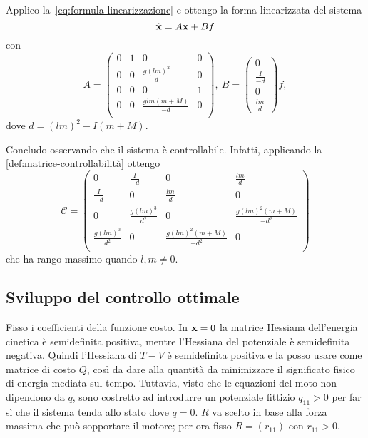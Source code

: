 Applico la~\eqref{eq:formula-linearizzazione} e ottengo la forma linearizzata
del sistema
\begin{equation*}
        \dot {\mathbf{x}} = A\mathbf{x} + Bf \\
\end{equation*}
con
\begin{equation*}
    A = \left(
            \begin{array}{cccc}
                0&1&0&0\\
                0&0&\frac{g(lm)^2}{d}&0\\
                0&0&0&1\\
                0&0&\frac{glm(m+M)}{-d}&0\\
            \end{array}
        \right),\
    B = \left(\begin{array}{c}0\\\frac{I}{-d}\\0\\\frac{lm}{d}\end{array}\right)f,
\end{equation*}
dove $d = (lm)^2-I(m+M)$.

Concludo osservando che il sistema è controllabile.
Infatti, applicando la \autoref{def:matrice-controllabilità}
ottengo
\begin{equation*}
    \mathcal C = \left(
        \begin{array}{cccc}
            0&\frac I {-d}&0&\frac{lm} d\\
            \frac I {-d}&0&\frac{lm} d&0\\
            0&\frac{g(lm)^3}{d^2}&0&\frac{g(lm)^2(m+M)}{-d^2}\\
            \frac{g(lm)^3}{d^2}&0&\frac{g(lm)^2(m+M)}{-d^2}&0\\
        \end{array}
        \right)
\end{equation*}
che ha rango massimo quando $l, m \neq 0$.

\subsection{Sviluppo del controllo ottimale}
Fisso i coefficienti della funzione costo.
In $\mathbf{x} = 0$ la matrice Hessiana dell'energia cinetica è
semidefinita positiva, mentre l'Hessiana del potenziale è
semidefinita negativa.
Quindi l'Hessiana di $T - V$ è semidefinita positiva e
la posso usare come matrice di costo $Q$,
così da dare alla quantità
da minimizzare il significato fisico di energia mediata sul tempo.
Tuttavia, visto che le equazioni del moto non dipendono da $q$,
sono costretto ad introdurre un potenziale fittizio
$q_{11} > 0$ per far sì che il sistema tenda allo
stato dove $q = 0$.
$R$ va scelto in base alla forza massima che può sopportare
il motore; per ora fisso $R = (r_{11})$ con $r_{11} > 0$.

